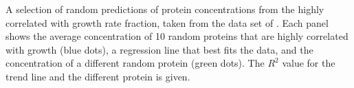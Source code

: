 \label{fig:randpred}
  A selection of random predictions of protein concentrations from the highly correlated with growth rate fraction, taken from the data set of \cite{Heinemann2014}.
  Each panel shows the average concentration of 10 random proteins that are highly correlated with growth (blue dots), a regression line that best fits the data, and the concentration of a different random protein (green dots).
  The $R^2$ value for the trend line and the different protein is given.
